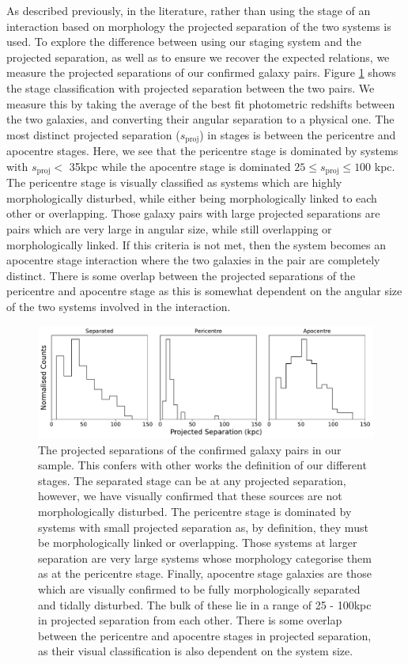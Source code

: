 As described previously, in the literature, rather than using the stage of an interaction based on morphology the projected separation of the two systems is used. To explore the difference between using our staging system and the projected separation, as well as to ensure we recover the expected relations, we measure the projected separations of our confirmed galaxy pairs. Figure \ref{fig:proj-seps} shows the stage classification with projected separation between the two pairs. We measure this by taking the average of the best fit photometric redshifts between the two galaxies, and converting their angular separation to a physical one. The most distinct projected separation ($s_{\mathrm{proj}}$) in stages is between the pericentre and apocentre stages. Here, we see that the pericentre stage is dominated by systems with $s_{\mathrm{proj}}<$ 35kpc while the apocentre stage is dominated $25 \leq s_{\mathrm{proj}} \leq 100$ kpc. The pericentre stage is visually classified as systems which are highly morphologically disturbed, while either being morphologically linked to each other or overlapping. Those galaxy pairs with large projected separations are pairs which are very large in angular size, while still overlapping or morphologically linked. If this criteria is not met, then the system becomes an apocentre stage interaction where the two galaxies in the pair are completely distinct. There is some overlap between the projected separations of the pericentre and apocentre stage as this is somewhat dependent on the angular size of the two systems involved in the interaction.

\begin{figure}
\centering
\includegraphics[width=\textwidth]{Chapter3/figures/projected-seps.pdf}
\caption[The projected separations of the confirmed galaxy pairs in our sample.]{The projected separations of the confirmed galaxy pairs in our sample. This confers with other works the definition of our different stages. The separated stage can be at any projected separation, however, we have visually confirmed that these sources are not morphologically disturbed. The pericentre stage is dominated by systems with small projected separation as, by definition, they must be morphologically linked or overlapping. Those systems at larger separation are very large systems whose morphology categorise them as at the pericentre stage. Finally, apocentre stage galaxies are those which are visually confirmed to be fully morphologically separated and tidally disturbed. The bulk of these lie in a range of 25 - 100kpc in projected separation from each other. There is some overlap between the pericentre and apocentre stages in projected separation, as their visual classification is also dependent on the system size.}
\label{fig:proj-seps}
\end{figure}

